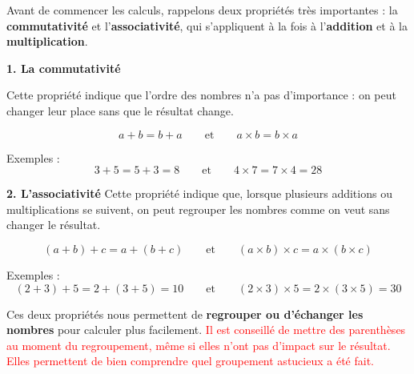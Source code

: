 \documentclass[answers]{exam}
\begin{document}
\begin{solution}

  Avant de commencer les calculs, rappelons deux propriétés très importantes :  
la \textbf{commutativité} et l’\textbf{associativité}, qui s’appliquent à la fois à l’\textbf{addition} et à la \textbf{multiplication}.

\bigskip
\textbf{1. La commutativité}

\vspace{1em}
Cette propriété indique que l’ordre des nombres n’a pas d’importance :  
on peut changer leur place sans que le résultat change.

\[
a + b = b + a \qquad \text{et} \qquad a \times b = b \times a
\]

Exemples :
\[
3 + 5 = 5 + 3 = 8 \qquad \text{et} \qquad 4 \times 7 = 7 \times 4 = 28
\]

\bigskip
\textbf{2. L’associativité}
\vspace{1em}
Cette propriété indique que, lorsque plusieurs additions ou multiplications se suivent,  
on peut regrouper les nombres comme on veut sans changer le résultat.

\[
(a + b) + c = a + (b + c) \qquad \text{et} \qquad (a \times b) \times c = a \times (b \times c)
\]

Exemples :
\[
(2 + 3) + 5 = 2 + (3 + 5) = 10 \qquad \text{et} \qquad (2 \times 3) \times 5 = 2 \times (3 \times 5) = 30
\]

\bigskip
Ces deux propriétés nous permettent de \textbf{regrouper ou d’échanger les nombres} pour calculer plus facilement.
\textcolor{red}{Il est conseillé de mettre des parenthèses au moment du regroupement, même si elles n'ont pas d'impact sur le résultat. Elles permettent de bien comprendre quel groupement astucieux a été fait.}

\bigskip


\end{solution}
\end{document}
